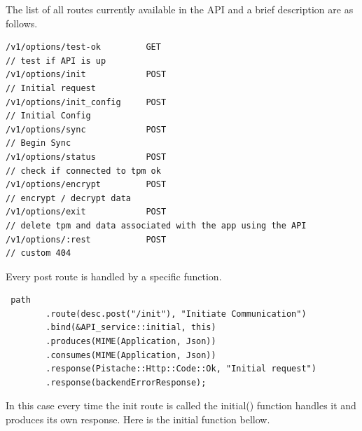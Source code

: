 The list of all routes currently available in the API and a brief description are as follows.
\begin{lstlisting}
/v1/options/test-ok         GET
// test if API is up
/v1/options/init            POST
// Initial request
/v1/options/init_config     POST
// Initial Config
/v1/options/sync            POST
// Begin Sync
/v1/options/status          POST
// check if connected to tpm ok
/v1/options/encrypt         POST
// encrypt / decrypt data
/v1/options/exit            POST
// delete tpm and data associated with the app using the API
/v1/options/:rest           POST
// custom 404
\end{lstlisting}

Every post route is handled by a specific function.
\begin{lstlisting}
 path
        .route(desc.post("/init"), "Initiate Communication")
        .bind(&API_service::initial, this)
        .produces(MIME(Application, Json))
        .consumes(MIME(Application, Json))
        .response(Pistache::Http::Code::Ok, "Initial request")
        .response(backendErrorResponse);
\end{lstlisting}

In this case every time the init route is called the initial() function handles it and produces its own response. Here is the initial function bellow.

